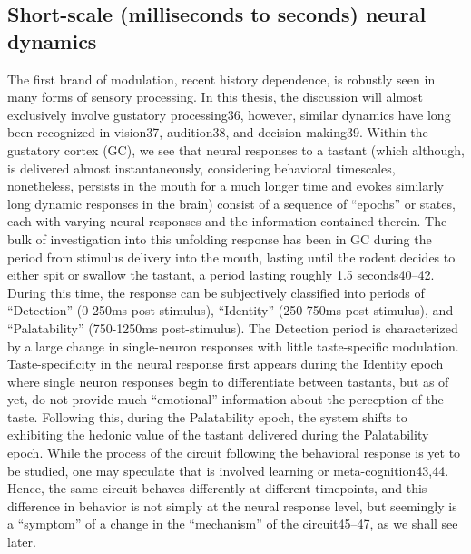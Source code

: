\begin{refsection}
\subsection{Short-scale (milliseconds to seconds) neural dynamics}
The first brand of modulation, recent history dependence, is robustly seen in many forms of sensory processing. In this thesis, the discussion will almost exclusively involve gustatory processing36, however, similar dynamics have long been recognized in vision37, audition38, and decision-making39. Within the gustatory cortex (GC), we see that neural responses to a tastant (which although, is delivered almost instantaneously, considering behavioral timescales, nonetheless, persists in the mouth for a much longer time and evokes similarly long dynamic responses in the brain) consist of a sequence of “epochs” or states, each with varying neural responses and the information contained therein. 
The bulk of investigation into this unfolding response has been in GC during the period from stimulus delivery into the mouth, lasting until the rodent decides to either spit or swallow the tastant, a period lasting roughly 1.5 seconds40–42. During this time, the response can be subjectively classified into periods of “Detection” (0-250ms post-stimulus), “Identity” (250-750ms post-stimulus), and “Palatability” (750-1250ms post-stimulus). The Detection period is characterized by a large change in single-neuron responses with little taste-specific modulation. Taste-specificity in the neural response first appears during the Identity epoch where single neuron responses begin to differentiate between tastants, but as of yet, do not provide much “emotional” information about the perception of the taste. Following this, during the Palatability epoch, the system shifts to exhibiting the hedonic value of the tastant delivered during the Palatability epoch. While the process of the circuit following the behavioral response is yet to be studied, one may speculate that is involved learning or meta-cognition43,44. Hence, the same circuit behaves differently at different timepoints, and this difference in behavior is not simply at the neural response level, but seemingly is a “symptom” of a change in the “mechanism” of the circuit45–47, as we shall see later.

\end{refsection}
